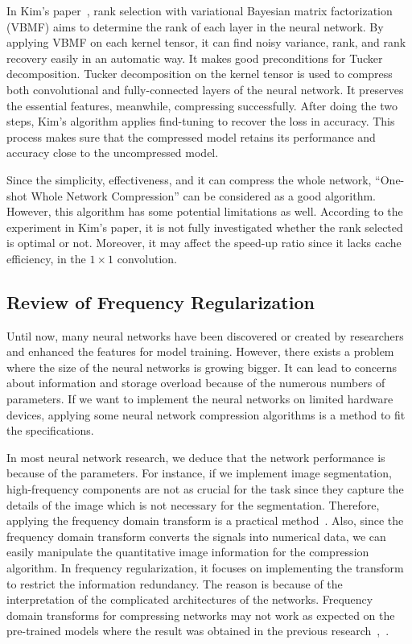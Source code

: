 \documentclass{article}
\begin{document}
In Kim’s paper~\cite{kim2016compression}, rank selection with variational Bayesian matrix factorization (VBMF) aims to determine the rank of each layer in the neural network. By applying VBMF on each kernel tensor, it can find noisy variance, rank, and rank recovery easily in an automatic way. It makes good preconditions for Tucker decomposition. Tucker decomposition on the kernel tensor is used to compress both convolutional and fully-connected layers of the neural network. It preserves the essential features, meanwhile, compressing successfully. After doing the two steps, Kim’s algorithm applies find-tuning to recover the loss in accuracy. This process makes sure that the compressed model retains its performance and accuracy close to the uncompressed model.

Since the simplicity, effectiveness, and it can compress the whole network, “One-shot Whole Network Compression” can be considered as a good algorithm. However, this algorithm has some potential limitations as well. According to the experiment in Kim’s paper, it is not fully investigated whether the rank selected is optimal or not. Moreover, it may affect the speed-up ratio since it lacks cache efficiency, in the $1 \times 1$ convolution.

\subsection{Review of Frequency Regularization}
Until now, many neural networks have been discovered or created by researchers and enhanced the features for model training. However, there exists a problem where the size of the neural networks is growing bigger. It can lead to concerns about information and storage overload because of the numerous numbers of parameters. If we want to implement the neural networks on limited hardware devices, applying some neural network compression algorithms is a method to fit the specifications. 

In most neural network research, we deduce that the network performance is because of the parameters. For instance, if we implement image segmentation, high-frequency components are not as crucial for the task since they capture the details of the image which is not necessary for the segmentation. Therefore, applying the frequency domain transform is a practical method~\cite{zhao2023frequency}. Also, since the frequency domain transform converts the signals into numerical data, we can easily manipulate the quantitative image information for the compression algorithm. In frequency regularization, it focuses on implementing the transform to restrict the information redundancy. The reason is because of the interpretation of the complicated architectures of the networks. Frequency domain transforms for compressing networks may not work as expected on the pre-trained models where the result was obtained in the previous research~\cite{zhao2023frequency},~\cite{NEURIPS2018}. 
\end{document}
